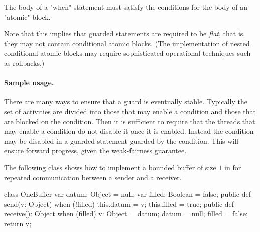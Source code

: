 {The body of a \xcd"when" statement must satisfy the conditions
for the body of an \xcd"atomic" block.

Note that this implies that guarded statements are required to be {\em
flat}, that is, they may not contain conditional atomic blocks. (The
implementation of nested conditional atomic blocks may require
sophisticated operational techniques such as rollbacks.)

\paragraph{Sample usage.} 
There are many ways to ensure that a guard is eventually
stable. Typically the set of activities are divided into those that
may enable a condition and those that are blocked on the
condition. Then it is sufficient to require that the threads that may
enable a condition do not disable it once it is enabled. Instead the
condition may be disabled in a guarded statement guarded by the
condition. This will ensure forward progress, given the weak-fairness
guarantee.

\begin{example}
The following class shows how to implement a bounded buffer of size
$1$ in \Xten{} for repeated communication between a sender and a
receiver.


\begin{xten}
class OneBuffer {
  var datum: Object = null;
  var filled: Boolean = false;
  public def send(v: Object) {
    when (!filled) {
      this.datum = v;
      this.filled = true;
    }
  }
  public def receive(): Object {
    when (filled) {
      v: Object = datum;
      datum = null;
      filled = false;
      return v;
    }
  }
}
\end{xten}
%
\end{example}

}
